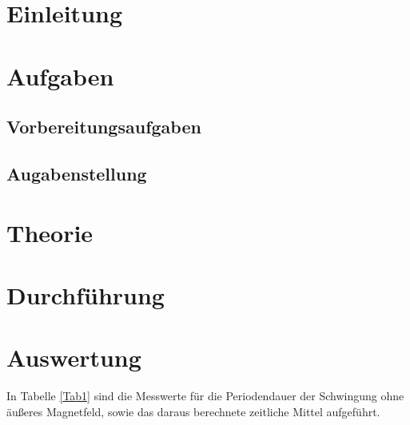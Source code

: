 



  \section{Einleitung}
  
  
  
  \section{Aufgaben}
  
  
  
    \subsection{Vorbereitungsaufgaben}
    
    
    
    \subsection{Augabenstellung}
    
    
    
  \section{Theorie}
  
  
  
  \section{Durchführung}
  
  
  
  \section{Auswertung}
   
  In Tabelle \ref{Tab1} sind die Messwerte für die Periodendauer der Schwingung ohne äußeres Magnetfeld, sowie das daraus berechnete zeitliche Mittel aufgeführt.

    
    
